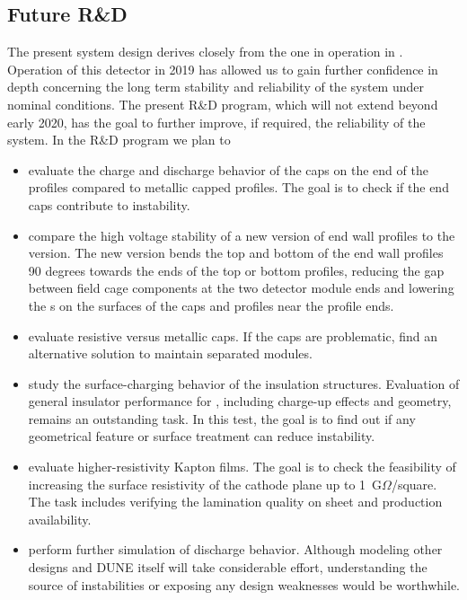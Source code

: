 \subsection{Future R\&D}
\label{sec:fdsp-hv-protodune-RD}

The present  system design derives closely from the one in operation in .  Operation of this detector in 2019 has allowed us to gain further confidence in depth concerning the long term stability and reliability of the  system under nominal conditions.  The present R\&D program, which will not extend beyond early 2020, has the goal to further improve, if required, the reliability of the system.   
In the R\&D program we plan to  

\begin{itemize}
\item evaluate the charge and discharge behavior of the  caps on the end of the profiles compared to metallic capped profiles.  The goal is to check if the end caps contribute to  instability. 

\item compare the high voltage stability of a new version of end wall profiles to the  version.  The new version bends the top and bottom of the end wall profiles 90 degrees towards the ends of the top or bottom profiles, reducing the gap between field cage components at the two detector module ends and lowering the \efield{}s on the surfaces of the  caps and profiles near the profile ends.
\item evaluate resistive versus metallic caps.  If the  caps are %
problematic, find an alternative solution to maintain separated  modules.
\item study the surface-charging behavior of the  insulation structures.  Evaluation of general insulator performance for , including charge-up effects and geometry, remains an outstanding task.  In this test, the goal is to find out if any geometrical feature or surface treatment can reduce  instability.
\item evaluate higher-resistivity Kapton films.  The goal is to check the feasibility of increasing the surface resistivity of the cathode plane up to 1~G$\Omega$/square.  The task includes verifying the lamination quality on \frfour sheet and production availability.
\item perform further simulation of   discharge behavior. Although modeling other  designs and DUNE itself will take considerable effort, %
understanding the source of instabilities or exposing any design weaknesses would be worthwhile. %
\end{itemize}

